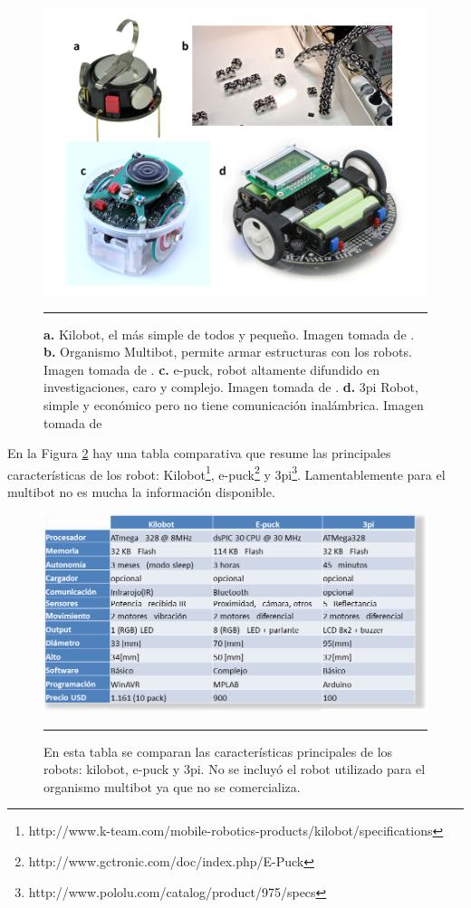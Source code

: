 \begin{figure}[htbp]
	\centering
		\includegraphics[width=\textwidth]{./Figures/robots1.png}
		\rule{35em}{0.5pt} 
	\caption[Robots estudiados como alternativa para armar un enjambre de robots.]{\textbf{a.} Kilobot, el más simple de todos y pequeño. Imagen tomada de \cite{6224638}. \textbf{b.} Organismo Multibot, permite armar estructuras con los robots. Imagen tomada de \cite{5359578}. \textbf{c.} e-puck, robot altamente difundido en investigaciones, caro y complejo. Imagen tomada de \cite{mondada2009puck}. \textbf{d.} 3pi Robot, simple y económico pero no tiene comunicación inalámbrica. Imagen tomada de \cite{thurskyusing}}
	\label{fig:robots estudiados}
\end{figure}

En la Figura \ref{fig:Tabla robots} hay una tabla comparativa que resume las principales características de los robot: Kilobot\footnote{http://www.k-team.com/mobile-robotics-products/kilobot/specifications}, e-puck\footnote{http://www.gctronic.com/doc/index.php/E-Puck} y 3pi\footnote{http://www.pololu.com/catalog/product/975/specs}. Lamentablemente para el multibot no es mucha la información disponible.


\begin{figure}[htbp]
	\centering
		\includegraphics[width=1\textwidth]{./Figures/tabla_robots.png}
		\rule{35em}{0.5pt}
	\caption[Tabla comparativa robots]{En esta tabla se comparan las características principales de los robots: kilobot, e-puck y 3pi. No se incluyó el robot utilizado para el organismo multibot ya que no se comercializa.}
	\label{fig:Tabla robots}
\end{figure}

